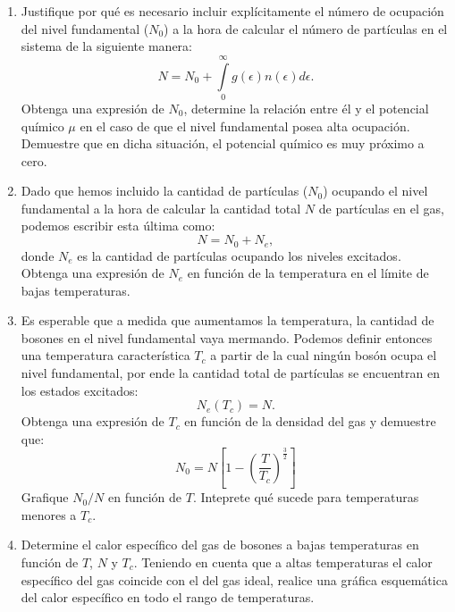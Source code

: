 \documentclass[a4paper,11pt]{article}
\begin{document}
\begin{enumerate}[label=(\alph*),
                  leftmargin=2\parindent,
                  rightmargin=2\parindent]

     \item{Justifique por qué es necesario incluir explícitamente el número 
           de ocupación del nivel fundamental ($N_0$) a la hora de calcular el 
           número de partículas en el sistema de la siguiente manera:
           $$ 
           N = 
           N_0 + \int\limits_0^\infty g(\epsilon) n(\epsilon) 
           d\epsilon.
           $$
           Obtenga una expresión de $N_0$, determine la relación entre él y el 
           potencial químico $\mu$ en el caso de que el nivel fundamental 
           posea alta ocupación.
           Demuestre que en dicha situación, el potencial químico es muy 
           próximo a cero.
           }

     \item{Dado que hemos incluido la cantidad de partículas ($N_0$) ocupando 
           el nivel fundamental a la hora de calcular la cantidad total $N$ de 
           partículas en el gas, podemos escribir esta última como:
           $$ N = N_0 + N_e, $$
           donde $N_e$ es la cantidad de partículas ocupando los niveles 
           excitados.
           Obtenga una expresión de $N_e$ en función de la temperatura en el 
           límite de bajas temperaturas.}
     
     \item{Es esperable que a medida que aumentamos la temperatura, la 
           cantidad de bosones en el nivel fundamental vaya mermando.
           Podemos definir entonces una temperatura característica $T_c$ a 
           partir de la cual ningún bosón ocupa el nivel fundamental, por 
           ende la cantidad total de partículas se encuentran en los estados 
           excitados:
           $$ N_e(T_c) = N. $$
           Obtenga una expresión de $T_c$ en función de la densidad del gas 
           y demuestre que:
           $$ 
           N_0 =
           N \left[ 1 - \left( \frac{T}{T_c} \right)^\frac{3}{2} \right]
           $$
           Grafique $N_0/N$ en función de $T$.
           Inteprete qué sucede para temperaturas menores a $T_c$.
           }

     \item{Determine el calor específico del gas de bosones a bajas 
           temperaturas en función de $T$, $N$ y $T_c$.
           Teniendo en cuenta que a altas temperaturas el calor específico 
           del gas coincide con el del gas ideal, realice una gráfica 
           esquemática del calor específico en todo el rango de temperaturas.
           }

\end{enumerate}
\end{document}

